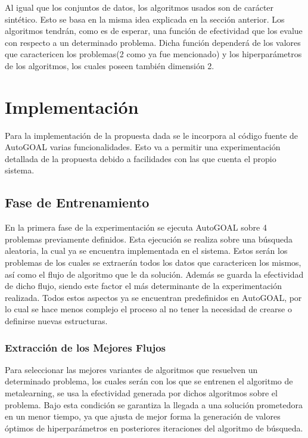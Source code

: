 Al igual que los conjuntos de datos, los algoritmos usados son de carácter
sintético. Esto se basa en la misma idea explicada en la sección anterior. Los
algoritmos tendrán, como es de esperar, una función de efectividad que los
evalue con respecto a un determinado problema. Dicha función dependerá de los
valores que caractericen los problemas(2 como ya fue mencionado) y los
hiperparámetros de los algoritmos, los cuales poseen también dimensión 2.

\section{Implementación}\label{sec:det_impl}

Para la implementación de la propuesta dada se le incorpora al código fuente
de AutoGOAL varias funcionalidades. Esto va a permitir una experimentación
detallada de la propuesta debido a facilidades con las que cuenta el propio
sistema.

\subsection{Fase de Entrenamiento}

En la primera fase de la experimentación se ejecuta AutoGOAL sobre 4 problemas
previamente definidos. Esta ejecución se realiza sobre una búsqueda aleatoria,
la cual ya se encuentra implementada en el sistema. Estos serán los problemas
de los cuales se extraerán todos los datos que caractericen los mismos, así
como el flujo de algoritmo que le da solución. Además se guarda la efectividad
de dicho flujo, siendo este factor el más determinante de la experimentación
realizada. Todos estos aspectos ya se encuentran predefinidos en AutoGOAL, por
lo cual se hace menos complejo el proceso al no tener la necesidad de crearse
o definirse nuevas estructuras.

\subsubsection{Extracción de los Mejores Flujos}

Para seleccionar las mejores variantes de algoritmos que resuelven un
determinado problema, los cuales serán con los que se entrenen el algoritmo
de metalearning, se usa la efectividad generada por dichos algoritmos sobre
el problema. Bajo esta condición se garantiza la llegada a una solución
prometedora en un menor tiempo, ya que ajusta de mejor forma la generación de
valores óptimos de hiperparámetros en posteriores iteraciones del algoritmo de
búsqueda.

